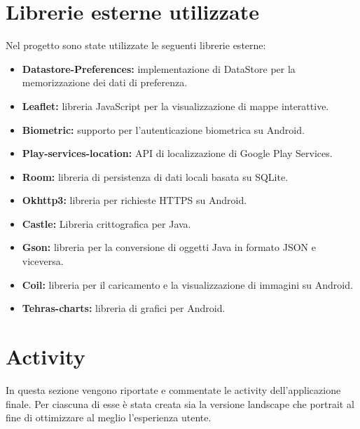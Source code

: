 \documentclass[a4paper,final,12pt]{report}
\begin{document}
\section{Librerie esterne utilizzate}
Nel progetto sono state utilizzate le seguenti librerie esterne:
\begin{itemize}
    \item \textbf{Datastore-Preferences:} implementazione di DataStore per la memorizzazione dei dati di preferenza.
    \item \textbf{Leaflet:} libreria JavaScript per la visualizzazione di mappe interattive.
    \item \textbf{Biometric:} supporto per l'autenticazione biometrica su Android.
    \item \textbf{Play-services-location:} API di localizzazione di Google Play Services.
    \item \textbf{Room:}  libreria di persistenza di dati locali basata su SQLite.
    \item \textbf{Okhttp3:} libreria per richieste HTTPS su Android.
    \item \textbf{Castle:} Libreria crittografica per Java.
    \item \textbf{Gson:} libreria per la conversione di oggetti Java in formato JSON e viceversa.
    \item \textbf{Coil:} libreria per il caricamento e la visualizzazione di immagini su Android.
    \item \textbf{Tehras-charts:} libreria di grafici per Android.
\end{itemize}

\newpage


\section{Activity}
In questa sezione vengono riportate e commentate le activity dell'applicazione finale. Per ciascuna di esse è stata creata sia la versione landscape che portrait al fine di ottimizzare al meglio l'esperienza utente. 
\end{document}
